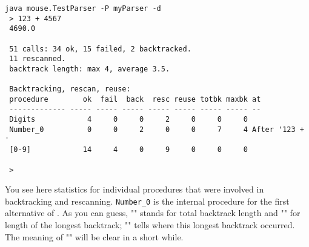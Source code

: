 \small
\begin{Verbatim}[samepage=true,xleftmargin=15mm,baselinestretch=0.8]
 java mouse.TestParser -P myParser -d
 > 123 + 4567   
 4690.0

 51 calls: 34 ok, 15 failed, 2 backtracked.
 11 rescanned.
 backtrack length: max 4, average 3.5.
 
 Backtracking, rescan, reuse:
 procedure        ok  fail  back  resc reuse totbk maxbk at             
 ------------- ----- ----- ----- ----- ----- ----- ----- --             
 Digits            4     0     0     2     0     0     0
 Number_0          0     0     2     0     0     7     4 After '123 + ' 
 [0-9]            14     4     0     9     0     0     0
 
 >
\end{Verbatim}
\normalsize

You see here statistics for individual procedures that were involved
in backtracking and rescanning.
\verb#Number_0# is the internal procedure for the first alternative of \Number.
As you can guess, "" stands for total backtrack length
and "" for length of the longest backtrack; 
"" tells where this longest backtrack occurred.
The meaning of "" will be clear in a short while.

